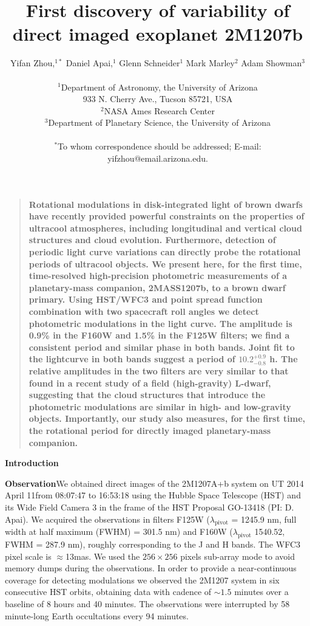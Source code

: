\documentclass[12pt]{article}
\title{First discovery of variability of direct imaged exoplanet 2M1207b}
\author
{Yifan Zhou,$^{1\ast}$ Daniel Apai,$^{1}$ Glenn Schneider$^{1}$ Mark
  Marley$^{2}$ Adam Showman$^{3}$\\
\\
\normalsize{$^{1}$Department of Astronomy, the University of Arizona}\\
\normalsize{933 N. Cherry Ave., Tucson 85721, USA}\\
\normalsize{$^{2}$NASA Ames Research Center}\\
\normalsize{$^{3}$Department of Planetary Science, the University of Arizona}\\
\\
\normalsize{$^\ast$To whom correspondence should be addressed; E-mail:
  yifzhou@email.arizona.edu.}
}
\date{}
\newenvironment{sciabstract}{%
\begin{quote} \bf}
{\end{quote}}
\begin{document}
 

 


\baselineskip24pt


\maketitle 




\begin{sciabstract}
Rotational modulations in disk-integrated light of
brown dwarfs have recently provided powerful constraints on the
properties of ultracool atmospheres, including longitudinal and
vertical cloud structures and cloud evolution. Furthermore, detection
of periodic light curve variations can directly probe the rotational
periods of ultracool objects. We present here, for the first time, time-resolved high-precision
photometric measurements of a planetary-mass companion, 2MASS1207b, to
a brown dwarf primary. Using HST/WFC3 and point spread function %
combination with two spacecraft roll angles we detect photometric
modulations in the light curve. The amplitude is 0.9\% in the F160W
and 1.5\% in the F125W filters; we find a consistent period and
similar phase in both bands. Joint fit to the lightcurve in both bands
suggest a period of $10.2^{+0.9}_{-0.8}$ h. The relative amplitudes in the two
filters are very similar to that found in a recent study of a field
(high-gravity) L-dwarf, suggesting that the cloud structures that
introduce the photometric modulations are similar in high- and
low-gravity objects. Importantly, our study also measures, for the
first time, the rotational period for directly imaged planetary-mass
companion.
\end{sciabstract}

\textbf{Introduction}

\textbf{Observation}We obtained direct images of the 2M1207A+b
system on UT 2014 April 11from 08:07:47 to 16:53:18 using the Hubble
Space Telescope (HST) and its Wide Field Camera 3 \citep[WFC3,
][]{Kimble2008} in the frame of the HST Proposal GO-13418 (PI:
D. Apai). We acquired the observations in filters F125W
($\lambda_{\mbox{pivot}}$ = 1245.9 nm, full width at half maximum
(FWHM) = 301.5 nm) and F160W ($\lambda_{\mbox{pivot}}$ 1540.52, FWHM =
287.9 nm), roughly corresponding to the J and H bands. The WFC3 pixel
scale is $\approx$13mas. We used the $256\times256$ pixels sub-array
mode to avoid memory dumps during the observations.  In order to
provide a near-continuous coverage for detecting modulations we
observed the 2M1207 system in six consecutive HST orbits, obtaining
data with cadence of $\sim1.5$ minutes over a baseline of 8 hours and
40 minutes. The observations were interrupted by 58 minute-long Earth
occultations every 94 minutes.
\end{document}
